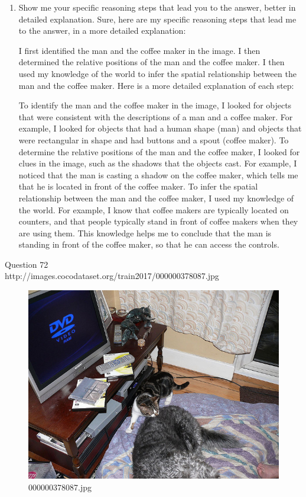 \begin{enumerate}
    The man is a human being that is typically found in homes and public places.
    The coffee maker is an appliance that is used to make coffee.
    The man is standing in front of the coffee maker, meaning that he is facing the coffee maker.
    The coffee maker is located on the counter, meaning that it is above the ground.
    Is there anything else you want me to help you with?
    \item Show me your specific reasoning steps that lead you to the answer, better in detailed explanation.
    \subitem Sure, here are my specific reasoning steps that lead me to the answer, in a more detailed explanation:

    I first identified the man and the coffee maker in the image.
    I then determined the relative positions of the man and the coffee maker.
    I then used my knowledge of the world to infer the spatial relationship between the man and the coffee maker.
    Here is a more detailed explanation of each step:
    
    To identify the man and the coffee maker in the image, I looked for objects that were consistent with the descriptions of a man and a coffee maker. For example, I looked for objects that had a human shape (man) and objects that were rectangular in shape and had buttons and a spout (coffee maker).
    To determine the relative positions of the man and the coffee maker, I looked for clues in the image, such as the shadows that the objects cast. For example, I noticed that the man is casting a shadow on the coffee maker, which tells me that he is located in front of the coffee maker.
    To infer the spatial relationship between the man and the coffee maker, I used my knowledge of the world. For example, I know that coffee makers are typically located on counters, and that people typically stand in front of coffee makers when they are using them. This knowledge helps me to conclude that the man is standing in front of the coffee maker, so that he can access the controls.
\end{enumerate}
Question 72\\
http://images.cocodataset.org/train2017/000000378087.jpg
\begin{figure}[h]
    \centering
    \includegraphics[width=0.8\linewidth]{../image set/hard/000000378087.jpg}
    \caption{000000378087.jpg}
\end{figure}
